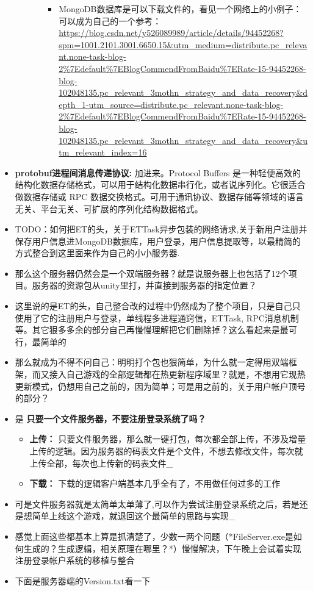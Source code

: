 \documentclass[9pt, b5paper]{article}
\begin{document}
\begin{itemize}
\begin{itemize}
\begin{itemize}
\begin{itemize}
\item MongoDB数据库是可以下载文件的，看见一个网络上的小例子：可以成为自己的一个参考：\url{https://blog.csdn.net/y526089989/article/details/94452268?spm=1001.2101.3001.6650.15&utm_medium=distribute.pc_relevant.none-task-blog-2\%7Edefault\%7EBlogCommendFromBaidu\%7ERate-15-94452268-blog-102048135.pc_relevant_3mothn_strategy_and_data_recovery&depth_1-utm_source=distribute.pc_relevant.none-task-blog-2\%7Edefault\%7EBlogCommendFromBaidu\%7ERate-15-94452268-blog-102048135.pc_relevant_3mothn_strategy_and_data_recovery&utm_relevant_index=16}
\end{itemize}
\end{itemize}
\end{itemize}
\item \textbf{protobuf进程间消息传递协议:} 加进来。Protocol Buffers 是一种轻便高效的结构化数据存储格式，可以用于结构化数据串行化，或者说序列化。它很适合做数据存储或 RPC 数据交换格式。可用于通讯协议、数据存储等领域的语言无关、平台无关、可扩展的序列化结构数据格式。
\item TODO：如何把ET的头，关于ETTask异步包装的网络请求,关于新用户注册并保存用户信息进MongoDB数据库，用户登录，用户信息提取等，以最精简的方式整合到这里面来作为自己的小小服务器.
\item 那么这个服务器仍然会是一个双端服务器？就是说服务器上也包括了12个项目。服务器的资源包从unity里打，并直接到服务器的指定位置？
\item 这里说的是ET的头，自己整合改的过程中仍然成为了整个项目，只是自己只使用了它的注册用户与登录，单线程多进程通窍信，ETTask, RPC消息机制等。其它狠多多余的部分自己再慢慢理解把它们删除掉？这么看起来是最可行，最简单的
\item 那么就成为不得不问自己：明明打个包也狠简单，为什么就一定得用双端框架，而又接入自己游戏的全部逻辑都在热更新程序域里？就是，不想用它现热更新模式，仍想用自己之前的，因为简单；可是用之前的，关于用户帐户顶号的部分？
\item 是 \textbf{只要一个文件服务器，不要注册登录系统了吗？}
\begin{itemize}
\item \textbf{上传：} 只要文件服务器，那么就一键打包，每次都全部上传，不涉及增量上传的逻辑。因为服务器的码表文件是个文件，不想去修改文件，每次就上传全部，每次也上传新的码表文件\_
\item \textbf{下载：} 下载的逻辑客户端基本几乎全有了，不用做任何过多的工作
\end{itemize}
\item 可是文件服务器就是太简单太单薄了,可以作为尝试注册登录系统之后，若是还是想简单上线这个游戏，就退回这个最简单的思路与实现\_
\item 感觉上面这些都基本上算是抓清楚了，少数一两个问题（*FileServer.exe是如何生成的？生成逻辑，相关原理在哪里？*）慢慢解决，下午晚上会试着实现注册登录帐户系统的移植与整合
\item 下面是服务器端的Version.txt看一下
\end{itemize}
\end{document}
